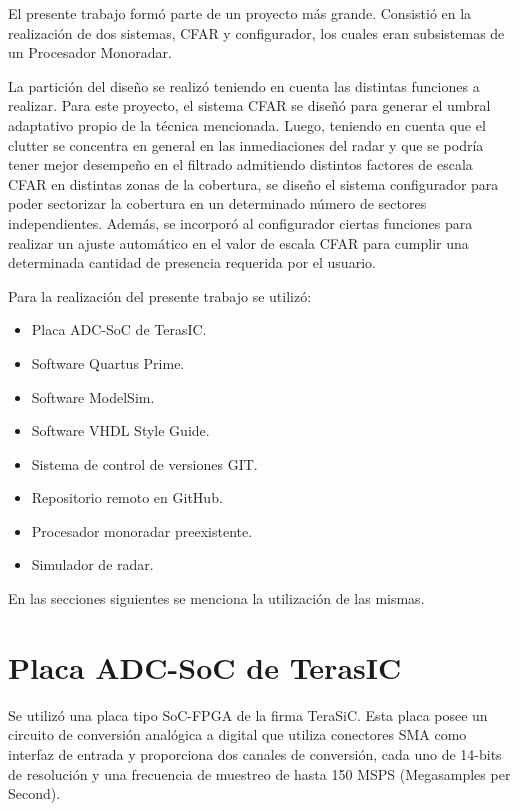 

El presente trabajo formó parte de un proyecto más grande. Consistió en la realización de dos sistemas, CFAR y configurador, los cuales eran subsistemas de un Procesador Monoradar.

La partición del diseño se realizó teniendo en cuenta las distintas funciones a realizar. Para este proyecto, el sistema CFAR se diseñó para generar el umbral adaptativo propio de la técnica mencionada. Luego, teniendo en cuenta que el clutter se concentra en general en las inmediaciones del radar y que se podría tener mejor desempeño en el filtrado admitiendo distintos factores de escala CFAR en distintas zonas de la cobertura, se diseño el sistema configurador para poder sectorizar la cobertura en un determinado número de sectores independientes. Además, se incorporó al configurador ciertas funciones para realizar un ajuste automático en el valor de escala CFAR para cumplir una determinada cantidad de presencia requerida por el usuario.

Para la realización del presente trabajo se utilizó:
\begin{itemize}
\item Placa ADC-SoC de TerasIC.
\item Software Quartus Prime.
\item Software ModelSim.
\item Software VHDL Style Guide.
\item Sistema de control de versiones GIT.
\item Repositorio remoto en GitHub.
\item Procesador monoradar preexistente.
\item Simulador de radar.

\end{itemize}

En las secciones siguientes se menciona la utilización de las mismas.

\section{Placa ADC-SoC de TerasIC}
Se utilizó una placa tipo SoC-FPGA de la firma TeraSiC. Esta placa posee un circuito de conversión analógica a digital que utiliza conectores SMA como interfaz de entrada y proporciona dos canales de conversión, cada uno de 14-bits de resolución y una frecuencia de muestreo de hasta 150 MSPS (Megasamples per Second).

